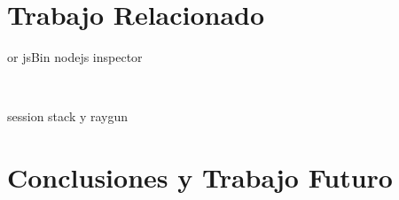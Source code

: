 \documentclass[conference]{IEEEtran}
\begin{document}
\bigskip

\section{Trabajo Relacionado}
\label{sec:rw}


\bigskip

 or jsBin nodejs inspector
\smallskip

~\cite{tod:oopsla2007,azar:2016,barrAl:fse2016}
\smallskip


 session stack y raygun
\smallskip

\bigskip

\section{Conclusiones y Trabajo Futuro}
\label{sec:conc}


\smallskip




\end{document}
